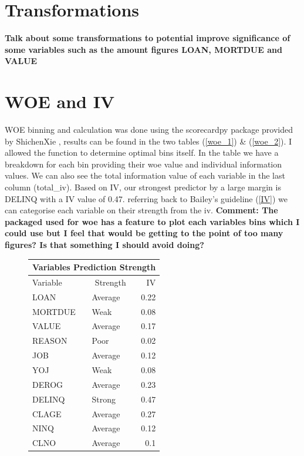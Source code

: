 \section{Transformations}

\textbf{Talk about some transformations to potential improve significance of some variables such as the amount figures LOAN, MORTDUE and VALUE}

\section{WOE and IV}

WOE binning and calculation was done using the scorecardpy package provided by ShichenXie \cite{scorecardpy}, results can be found in the two tables (\ref{woe_1}) \& (\ref{woe_2}). I allowed the function to determine optimal bins itself. In the table we have a breakdown for each bin providing their woe value and individual information values. We can also see the total information value of each variable in the last column (total\_iv). Based on IV, our strongest predictor by a large margin is DELINQ with a IV value of 0.47. referring back to Bailey's guideline (\ref{IV})\cite{bailey2004credit} we can categorise each variable on their strength from the iv. \textbf{Comment: The packaged used for woe has a feature to plot each variables bins which I could use but I feel that would be getting to the point of too many figures? Is that something I should avoid doing?}

\begin{figure}[ht]\label{Table2}
	\centering
	\renewcommand{\arraystretch}{1.25}
	\begin{tabular}{llr}
	\multicolumn{3}{c}{Variables Prediction Strength}\\
	\hline
	Variable & \multicolumn{1}{c}{Strength} & IV\\ 
	\hline
	LOAN & Average & 0.22\\
	MORTDUE & Weak & 0.08\\
	VALUE & Average & 0.17\\
	REASON & Poor & 0.02\\
	JOB & Average & 0.12\\
	YOJ & Weak & 0.08\\
	DEROG & Average & 0.23\\
	DELINQ & Strong & 0.47\\
	CLAGE & Average & 0.27\\
	NINQ & Average & 0.12\\
	CLNO & Average & 0.1\\
	\bottomrule
	\end{tabular}
\end{figure}

